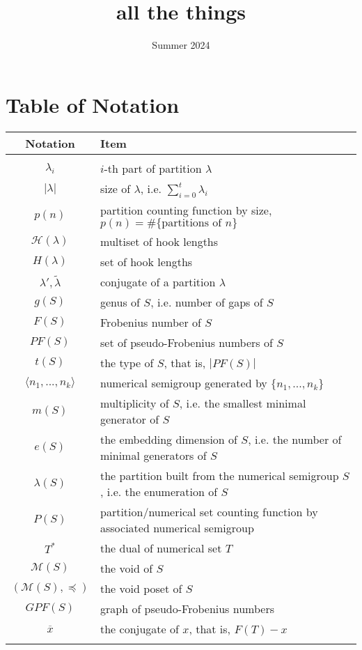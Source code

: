 \documentclass{article}
\title{all the things}
\date{Summer 2024}
\theoremstyle{definition}
\theoremstyle{definition}
\theoremstyle{definition}
\begin{document}
\section{Table of Notation}
\begin{table}[!h]
    \centering
    \begin{tabularx}{\textwidth}{c|X}
        Notation & Item \\
        \hline \\
        $\lambda_i$ & $i$-th part of partition $\lambda$ \\
        $|\lambda|$ & size of $\lambda$, i.e. $\sum_{i=0}^t\lambda_i$ \\
        $p(n)$ & partition counting function by size, $p(n) =  \#\{\text{partitions of }n\}$\\
         $\mathcal{H}(\lambda)$ & multiset of hook lengths \\
         $H(\lambda)$ & set of hook lengths \\
         $\lambda ', \tilde{\lambda}$ & conjugate of a partition $\lambda$ \\
         $g(S)$ & genus of $S$, i.e. number of gaps of $S$ \\
         $F(S)$ & Frobenius number of $S$ \\
         $PF(S)$ & set of pseudo-Frobenius numbers of $S$ \\
         $t(S)$ & the type of $S$, that is, $|PF(S)|$ \\
         $\langle n_1,..., n_k \rangle$ & numerical semigroup generated by $\{n_1, ...,n_k\}$ \\
         $m(S)$ & multiplicity of $S$, i.e. the smallest minimal generator of $S$ \\
         $e(S)$ & the embedding dimension of $S$, i.e. the number of minimal generators of $S$ \\
         $\lambda(S)$ & the partition built from the numerical semigroup $S$, \newline i.e. the enumeration of $S$ \\
         $P(S)$ & partition/numerical set counting function by associated numerical semigroup \\
         $T^*$& the dual of numerical set $T$ \\
         $\mathcal{M}(S)$& the void of $S$ \\
         $(\mathcal{M}(S), \preceq)$& the void poset of $S$ \\
         $GPF(S)$ & graph of pseudo-Frobenius numbers\\
         $\overline{x}$ & the conjugate of $x$, that is, $F(T) - x$\\
         & \\
    \end{tabularx}
\end{table}
\end{document}
